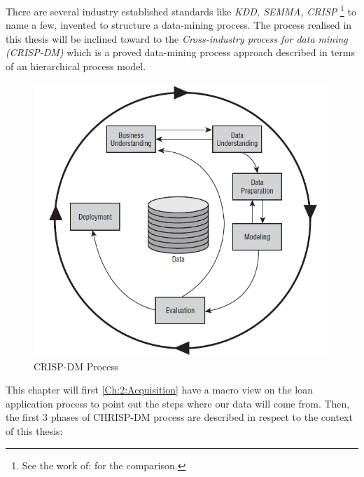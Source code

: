 There are several industry established standards like \textit{KDD, SEMMA, CRISP} \footnote{See the work of: \cite{Azevedo;Santos;Filipe:2008} for the comparison.} to name a few, invented to structure a data-mining process. The process realised in this thesis will be inclined toward to the \textit{Cross-industry process for data mining (CRISP-DM)} \cite{crisp} which is a proved data-mining process approach described in terms of an hierarchical process model.
\begin{figure}[h]
    \centering
    \includegraphics[scale=0.5]{Graphics/crisp-dm.png}
    \caption{CRISP-DM Process}
    \label{fig:crisp-dm}
\end{figure}
\newline
\newline
\newline
This chapter will first \ref{Ch:2:Acquisition} have a macro view on the loan application process to point out the steps where our data will come from. %
Then, the first 3 phases of CHRISP-DM process are described in respect to the context of this thesis:
